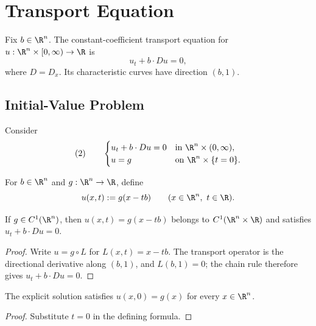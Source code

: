 
\section{Transport Equation}
\label{sec:transport-equation}

Fix $b\in\R^n$. The constant-coefficient transport equation for
$u:\R^n\times[0,\infty)\to\R$ is
$$u_t+b\cdot Du=0,$$
where $D=D_x$. Its characteristic curves have direction $(b,1)$.

\subsection{Initial-Value Problem}
\label{sec:transport-equation-initial-value-problem}

Consider
$$(2)\qquad
\begin{cases}
u_t+b\cdot Du=0&\text{in }\R^n\times(0,\infty),\\
u=g&\text{on }\R^n\times\{t=0\}.
\end{cases}$$

\begin{definition}
\label{def:transport-explicit-solution}
\leanok
For $b\in\R^n$ and $g:\R^n\to\R$, define
$$u(x,t):=g(x-tb)\qquad(x\in\R^n,\ t\in\R).$$
\end{definition}

\begin{theorem}
\label{thm:transport-ivp-solution}
\leanok
If $g\in C^1(\R^n)$, then $u(x,t)=g(x-tb)$ belongs to
$C^1(\R^n\times\R)$ and satisfies $u_t+b\cdot Du=0$.
\end{theorem}
\begin{proof}
\leanok
\sketch Write $u=g\circ L$ for $L(x,t)=x-tb$. The transport operator is the
directional derivative along $(b,1)$, and $L(b,1)=0$; the chain rule therefore
gives $u_t+b\cdot Du=0$.
\end{proof}

\begin{theorem}
\label{thm:transport-initial-condition}
\leanok
The explicit solution satisfies $u(x,0)=g(x)$ for every $x\in\R^n$.
\end{theorem}
\begin{proof}
\leanok
\sketch Substitute $t=0$ in the defining formula.
\end{proof}

